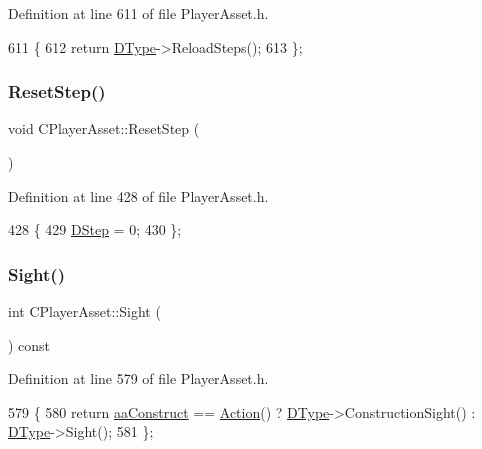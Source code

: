 Definition at line 611 of file Player\+Asset.\+h.


\begin{DoxyCode}
611                                \{
612             \textcolor{keywordflow}{return} \hyperlink{classCPlayerAsset_a5d61f73471e1e6f0a6ab15f2ffa7b359}{DType}->ReloadSteps();
613         \};
\end{DoxyCode}
\hypertarget{classCPlayerAsset_ae94600f78d050944f4d93dcbbf8c0ee0}{}\label{classCPlayerAsset_ae94600f78d050944f4d93dcbbf8c0ee0} 
\subsubsection{\texorpdfstring{Reset\+Step()}{ResetStep()}}
{\footnotesize\ttfamily void C\+Player\+Asset\+::\+Reset\+Step (\begin{DoxyParamCaption}{ }\end{DoxyParamCaption})\hspace{0.3cm}{\ttfamily [inline]}}



Definition at line 428 of file Player\+Asset.\+h.


\begin{DoxyCode}
428                         \{
429             \hyperlink{classCPlayerAsset_a7964d2161d51b3edd66fbc9c59eba4b0}{DStep} = 0;  
430         \};
\end{DoxyCode}
\hypertarget{classCPlayerAsset_ac732622598cbd05dd2ec9233468e2b07}{}\label{classCPlayerAsset_ac732622598cbd05dd2ec9233468e2b07} 
\subsubsection{\texorpdfstring{Sight()}{Sight()}}
{\footnotesize\ttfamily int C\+Player\+Asset\+::\+Sight (\begin{DoxyParamCaption}{ }\end{DoxyParamCaption}) const\hspace{0.3cm}{\ttfamily [inline]}}



Definition at line 579 of file Player\+Asset.\+h.


\begin{DoxyCode}
579                          \{
580             \textcolor{keywordflow}{return} \hyperlink{GameDataTypes_8h_ab47668e651a3032cfb9c40ea2d60d670a7ef6b863f66dd7dcc95a199cd758ae1d}{aaConstruct} == \hyperlink{classCPlayerAsset_ad9a1fdc2ca221636ccab01891ea1f951}{Action}() ? \hyperlink{classCPlayerAsset_a5d61f73471e1e6f0a6ab15f2ffa7b359}{DType}->ConstructionSight() : 
      \hyperlink{classCPlayerAsset_a5d61f73471e1e6f0a6ab15f2ffa7b359}{DType}->Sight();  
581         \};
\end{DoxyCode}
\hypertarget{classCPlayerAsset_aaa297dbacfa25d61ce2b3498ed139c5b}{}\label{classCPlayerAsset_aaa297dbacfa25d61ce2b3498ed139c5b} 
